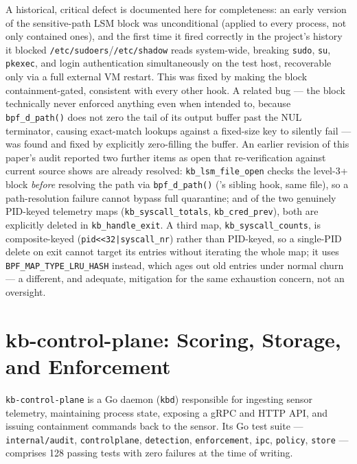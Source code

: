 \documentclass{article}
\begin{document}
A historical, critical defect is documented here for completeness: an
early version of the sensitive-path LSM block was unconditional
(applied to every process, not only contained ones), and the first time
it fired correctly in the project's history it blocked
\texttt{/etc/sudoers}/\texttt{/etc/shadow} reads system-wide, breaking
\texttt{sudo}, \texttt{su}, \texttt{pkexec}, and login authentication
simultaneously on the test host, recoverable only via a full external
VM restart. This was fixed by making the block containment-gated,
consistent with every other hook. A related bug --- the block
technically never enforced anything even when intended to, because
\texttt{bpf\_d\_path()} does not zero the tail of its output buffer
past the NUL terminator, causing exact-match lookups against a
fixed-size key to silently fail --- was found and fixed by explicitly
zero-filling the buffer. An earlier revision of this paper's audit
reported two further items as open that re-verification against
current source shows are already resolved: \texttt{kb\_lsm\_file\_open}
checks the level-3+ block \emph{before} resolving the path via
\texttt{bpf\_d\_path()} ('s sibling hook, same file), so a
path-resolution failure cannot bypass full quarantine; and of the two
genuinely PID-keyed telemetry maps (\texttt{kb\_syscall\_totals},
\texttt{kb\_cred\_prev}), both are explicitly deleted in
\texttt{kb\_handle\_exit}. A third map,
\texttt{kb\_syscall\_counts}, is composite-keyed
(\texttt{pid<<32|syscall\_nr}) rather than PID-keyed, so a single-PID
delete on exit cannot target its entries without iterating the whole
map; it uses \texttt{BPF\_MAP\_TYPE\_LRU\_HASH} instead, which ages out
old entries under normal churn --- a different, and adequate, mitigation
for the same exhaustion concern, not an oversight.

\section{kb-control-plane: Scoring, Storage, and Enforcement}
\label{sec:cp}

\texttt{kb-control-plane} is a Go daemon (\texttt{kbd}) responsible for
ingesting sensor telemetry, maintaining process state, exposing a gRPC
and HTTP API, and issuing containment commands back to the sensor. Its
Go test suite --- \texttt{internal/audit}, \texttt{controlplane},
\texttt{detection}, \texttt{enforcement}, \texttt{ipc}, \texttt{policy},
\texttt{store} --- comprises 128 passing tests with zero failures at
the time of writing.
\end{document}

